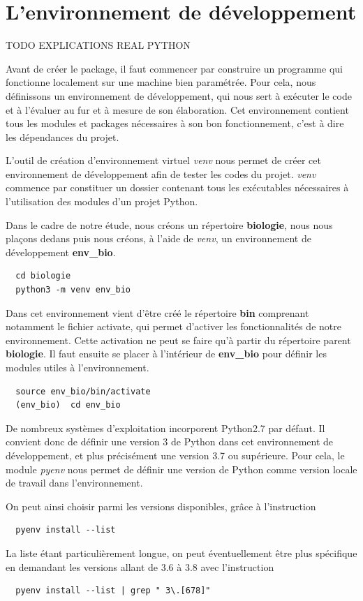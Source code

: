 \documentclass[twoside,a4paper,11pt,frenchb,openany]{report}
\begin{document}
\section{L'environnement de développement}

TODO EXPLICATIONS REAL PYTHON

Avant de créer le package, il faut commencer par construire un programme qui fonctionne localement sur une machine bien paramétrée. Pour cela, nous définissons un environnement de développement, qui nous sert à exécuter le code et à l'évaluer au fur et à mesure de son élaboration. Cet environnement contient tous les modules et packages nécessaires à son bon fonctionnement, c'est à dire les dépendances du projet.
 
L'outil de création d'environnement virtuel \textit{venv} nous permet de créer cet environnement de développement afin de tester les codes du projet. \textit{venv} commence par constituer un dossier contenant tous les exécutables nécessaires à l'utilisation des modules d'un projet Python. 

Dans le cadre de notre étude, nous créons un répertoire \textbf{biologie}, nous nous plaçons dedans puis nous créons, à l'aide de \textit{venv}, un environnement de développement \textbf{env\_bio}. 
\begin{verbatim}  cd biologie
  python3 -m venv env_bio\end{verbatim}

Dans cet environnement vient d'être créé le répertoire \textbf{bin} comprenant notamment le fichier activate, qui permet d'activer les fonctionnalités de notre environnement.
Cette activation ne peut se faire qu'à partir du répertoire parent \textbf{biologie}. Il faut ensuite se placer à l'intérieur de \textbf{env\_bio} pour définir les modules utiles à l'environnement. 
 \begin{verbatim}  source env_bio/bin/activate
  (env_bio)  cd env_bio\end{verbatim}

De nombreux systèmes d'exploitation incorporent Python2.7 par défaut. Il convient donc de définir une version 3 de Python dans cet environnement de développement, et plus précisément une version 3.7 ou supérieure. Pour cela, le module \textit{pyenv}  nous permet de définir une version de Python comme version locale de travail dans l'environnement. 

On peut ainsi choisir parmi les versions disponibles, grâce à l'instruction
\begin{verbatim}  pyenv install --list\end{verbatim}
La liste étant particulièrement longue, on peut éventuellement être plus spécifique en demandant les versions allant de 3.6 à 3.8 avec l'instruction
\begin{verbatim}  pyenv install --list | grep " 3\.[678]"\end{verbatim}
\end{document}
